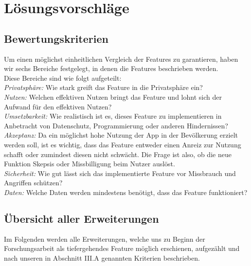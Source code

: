 \documentclass[conference]{IEEEtran}
\begin{document}
\section{Lösungsvorschläge} \label{Nebenfeatures}

\subsection{Bewertungskriterien}

Um einen möglichst einheitlichen Vergleich der Features zu garantieren, haben wir sechs Bereiche festgelegt, in denen die Features beschrieben werden.\\
Diese Bereiche sind wie folgt aufgeteilt:\\
\textit{Privatsphäre:} Wie stark greift das Feature in die Privatsphäre ein?\\
\textit{Nutzen:} Welchen effektiven Nutzen bringt das Feature und lohnt sich der Aufwand für den effektiven Nutzen?\\
\textit{Umsetzbarkeit:} Wie realistisch ist es, dieses Feature zu implementieren in Anbetracht von Datenschutz, Programmierung oder anderen Hindernissen?\\
\textit{Akzeptanz:} Da ein möglichst hohe Nutzung der App in der Bevölkerung erzielt werden soll, ist es wichtig, dass das Feature entweder einen Anreiz zur Nutzung schafft oder zumindest diesen nicht schwächt. Die Frage ist also, ob die neue Funktion Skepsis oder Missbilligung beim Nutzer auslöst.\\
\textit{Sicherheit:} Wie gut lässt sich das implementierte Feature vor Missbrauch und Angriffen schützen?\\
\textit{Daten:} Welche Daten werden mindestens benötigt, dass das Feature funktioniert?\\


\subsection{Übersicht aller Erweiterungen}

Im Folgenden werden alle Erweiterungen, welche uns zu Beginn der Forschungsarbeit als tiefergehendes Feature möglich erschienen, aufgezählt und nach unseren in Abschnitt III.A genannten Kriterien beschrieben.\\
\end{document}
